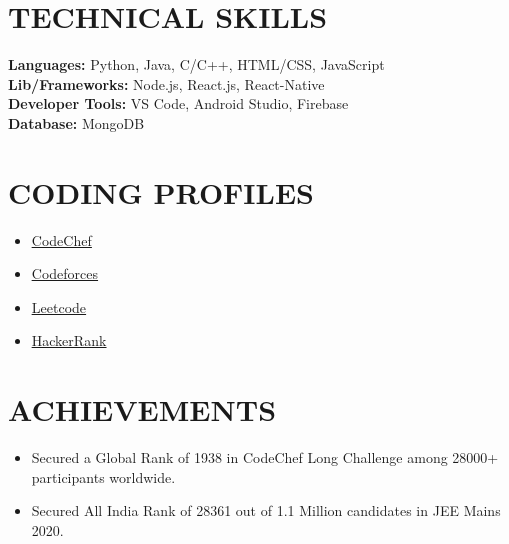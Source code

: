 \documentclass[letterpaper,11pt]{article}
\makeatletter
\newcommand{\resumeItem}[1]{
  \item\small{
    {#1 \vspace{-2pt}}
  }
}
\newcommand{\resumeSubheading}[4]{
  \vspace{-2pt}\item
    \begin{tabular*}{1.0\textwidth}[t]{l@{\extracolsep{\fill}}r}
      \textbf{#1} & \textbf{\small #2} \\
      \text{\small#3} & \text{\small #4} \\
    \end{tabular*}\vspace{-7pt}
}
\newcommand{\resumeSubHeadingListStart}{\begin{itemize}[leftmargin=0.0in, label={}]}
\newcommand{\resumeSubHeadingListEnd}{\end{itemize}}
\newcommand{\resumeItemListStart}{\begin{itemize}}
\newcommand{\resumeItemListEnd}{\end{itemize}\vspace{-5pt}}
\makeatother
\begin{document}
%
\section{TECHNICAL SKILLS}
 \begin{itemize}[leftmargin=0.15in, label={}]
    \small{\item{
     \textbf{Languages:}{ \hfill Python, Java, C/C++, HTML/CSS, JavaScript} \\
     \textbf{Lib/Frameworks:}{ \hfill Node.js, React.js, React-Native} \\
     \textbf{Developer Tools:}{ \hfill VS Code, Android Studio, Firebase} \\
     \textbf{Database:}{ \hfill MongoDB} \\
    }}
 \end{itemize}
 \vspace{-16pt}

\section{CODING PROFILES}
        \begin{multicols}{4}
            \begin{itemize}[itemsep=-5pt, parsep=3pt]
                \item\small \href{https://www.codechef.com/users/sriraj_2911}{\underline{CodeChef}}
                \item \href{https://codeforces.com/profile/SrirajBehera}{\underline{Codeforces}}
                \item \href{https://leetcode.com/SrirajBehera/}{\underline{Leetcode}}
                \item \href{https://www.hackerrank.com/behera_sriraj291}{\underline{HackerRank}}
            \end{itemize}
        \end{multicols}
        \vspace*{2.0\multicolsep}
        \vspace{5pt}


\section{ACHIEVEMENTS}
    \resumeSubHeadingListStart
            \resumeItemListStart
                \resumeItem{Secured a Global Rank of 1938 in CodeChef Long Challenge among 28000+ participants worldwide.}
                \resumeItem{Secured All India Rank of 28361 out of 1.1 Million candidates in JEE Mains 2020.}
            \resumeItemListEnd
        
    \resumeSubHeadingListEnd
\end{document}
